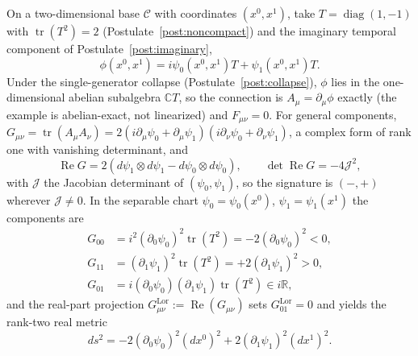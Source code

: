 On a two-dimensional base $\mathcal{C}$ with coordinates $(x^0, x^1)$, take $T = \operatorname{diag}(1,-1)$ with $\operatorname{tr}(T^2) = 2$ (Postulate~\ref{post:noncompact}) and the imaginary temporal component of Postulate~\ref{post:imaginary},
\begin{equation}
\phi(x^0, x^1) = i\psi_0(x^0, x^1) T + \psi_1(x^0, x^1) T.
\label{eq:complex_gauge_frame}
\end{equation}
Under the single-generator collapse (Postulate~\ref{post:collapse}), $\phi$ lies in the one-dimensional abelian subalgebra $\mathbb{C}T$, so the connection is $A_\mu = \partial_\mu\phi$ exactly (the example is abelian-exact, not linearized) and $F_{\mu\nu} = 0$. For general components, $G_{\mu\nu} = \operatorname{tr}(A_\mu A_\nu) = 2(i\partial_\mu\psi_0 + \partial_\mu\psi_1)(i\partial_\nu\psi_0 + \partial_\nu\psi_1)$, a complex form of rank one with vanishing determinant, and
\begin{equation}
\operatorname{Re}G = 2\left(d\psi_1 \otimes d\psi_1 - d\psi_0 \otimes d\psi_0\right), \qquad \det \operatorname{Re}G = -4\mathcal{J}^2,
\end{equation}
with $\mathcal{J}$ the Jacobian determinant of $(\psi_0, \psi_1)$, so the signature is $(-,+)$ wherever $\mathcal{J} \neq 0$. In the separable chart $\psi_0 = \psi_0(x^0)$, $\psi_1 = \psi_1(x^1)$ the components are
\begin{align}
G_{00} &= i^2 (\partial_0 \psi_0)^2 \operatorname{tr}(T^2) = -2(\partial_0 \psi_0)^2 < 0, \\
G_{11} &= (\partial_1 \psi_1)^2 \operatorname{tr}(T^2) = +2(\partial_1 \psi_1)^2 > 0, \\
G_{01} &= i(\partial_0 \psi_0)(\partial_1 \psi_1)\operatorname{tr}(T^2) \in i\mathbb{R},
\end{align}
and the real-part projection $G^{\mathrm{Lor}}_{\mu\nu} := \operatorname{Re}(G_{\mu\nu})$ sets $G^{\mathrm{Lor}}_{01} = 0$ and yields the rank-two real metric
\begin{equation}
\boxed{ds^2 = -2(\partial_0 \psi_0)^2 (dx^0)^2 + 2(\partial_1 \psi_1)^2 (dx^1)^2 .}
\label{eq:lorentzian_metric}
\end{equation}
